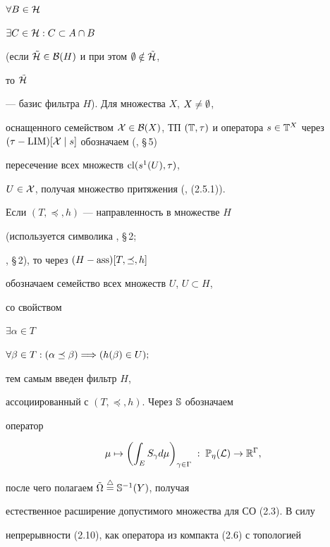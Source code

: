 $\forall B \in {\cal H}$


$\exists C \in {\cal H}:C\subset A \cap B$


(если $\tilde{\cal H} \in {\cal


B}(H)$ и при этом $\emp \notin \tilde{\cal H}$, 


то $\tilde{\cal H}$


--- базис фильтра $H$). Для множества $X$, $X \ne\emptyset$,


оснащенного семейством ${\cal X} \in {\cal B}(X)$, ТП $({\Bbb T},


\tau)$ и оператора $s \in {\Bbb T}^X$ через $(\tau - \LIM)[{\cal X}


\mid s]$ обозначаем (\cite{Ch5}, \S\,5)


пересечение всех множеств $\operatorname{cl}(s^1(U), \tau)$,


$U \in {\cal X}$, получая множество притяжения (\cite{Ch1}, (2.5.1)).


Если $(T, \preceq, h)$ --- направленность в множестве $H$


(используется символика \cite{Ch4}, \S\,2;


\cite{Ch6}, \S\,2), то через $(H - \operatorname{ass})[T,\preceq, h]$


обозначаем семейство всех множеств $U$, $U \subset H$,


со свойством 


$\exists \alpha \in T$


$\forall \beta \in T:(\alpha\preceq\beta) \Longrightarrow (h(\beta) \in U);$


тем самым введен фильтр $H$,


ассоциированный с $(T, \preceq, h)$. Через ${\Bbb S}$ обозначаем


оператор


%


\begin{equation}


\mu \mapsto \biggl(\int_E S_\gamma d\mu\biggr)_{\gamma \in \Gamma}\; : \;


{\Bbb P}_\eta({\cal L}) \to {\Bbb R}^\Gamma,


\end{equation}


%


после чего полагаем $\tilde\Omega \overset{\triangle}{=} {\Bbb S}^{-1}(Y)$, получая


естественное расширение допустимого множества для СО (2.3). В силу


непрерывности (2.10), как оператора из компакта (2.6) с топологией


